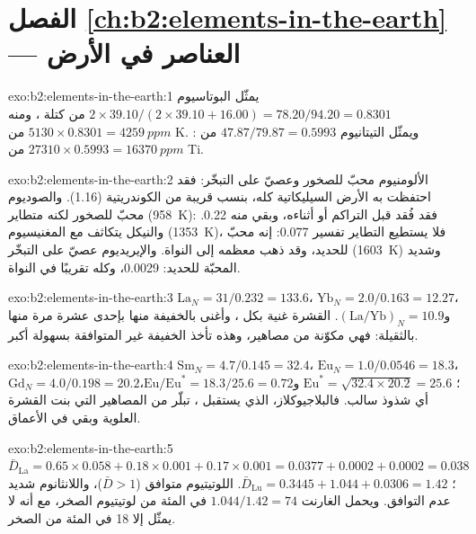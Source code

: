 \section*{الفصل \ref{ch:b2:elements-in-the-earth} --- العناصر في الأرض}

\begin{solution}{exo:b2:elements-in-the-earth:1}
يمثّل البوتاسيوم $2\times39.10/(2\times39.10+16.00) = 78.20/94.20 = 0.8301$ من كتلة
، ومنه $\num{5130}\times0.8301 = \qty{4259}{ppm}$ من K. ويمثّل التيتانيوم
$47.87/79.87 = 0.5993$ من : $\num{27310}\times0.5993 = \qty{16370}{ppm}$ من Ti.
\end{solution}

\begin{solution}{exo:b2:elements-in-the-earth:2}
الألومنيوم محبّ للصخور وعصيّ على التبخّر: فقد احتفظت به الأرض السيليكاتية كله، بنسب قريبة
من الكوندريتية (1.16). والصوديوم محبّ للصخور لكنه متطاير (\qty{958}{K}): فقد
فُقد قبل التراكم أو أثناءه، وبقي منه 0.22. والنيكل يتكاثف مع المغنيسيوم
(\qty{1353}{K})، فلا يستطيع التطاير تفسير 0.077: إنه محبّ للحديد، وقد ذهب معظمه
إلى النواة. والإيريديوم عصيّ على التبخّر (\qty{1603}{K}) وشديد المحبّة للحديد:
0.0029، وكله تقريبًا في النواة.
\end{solution}

\begin{solution}{exo:b2:elements-in-the-earth:3}
$\mathrm{La}_N = 31/0.232 = 133.6$، $\mathrm{Yb}_N = 2.0/0.163 = 12.27$،
و$(\mathrm{La}/\mathrm{Yb})_N = 10.9$. القشرة غنية بكل ،
وأغنى بالخفيفة منها بإحدى عشرة مرة منها بالثقيلة: فهي مكوّنة من مصاهير، وهذه
تأخذ  الخفيفة غير المتوافقة بسهولة أكبر.
\end{solution}

\begin{solution}{exo:b2:elements-in-the-earth:4}
$\mathrm{Sm}_N = 4.7/0.145 = 32.4$، $\mathrm{Eu}_N = 1.0/0.0546 = 18.3$،
$\mathrm{Gd}_N = 4.0/0.198 = 20.2$؛ $\mathrm{Eu}^* = \sqrt{32.4\times20.2} = 25.6$
و$\mathrm{Eu}/\mathrm{Eu}^* = 18.3/25.6 = 0.72$، أي شذوذ سالب. فالبلاجيوكلاز، الذي
يستقبل ، تبلّر من المصاهير التي بنت القشرة العلوية وبقي
في الأعماق.
\end{solution}

\begin{solution}{exo:b2:elements-in-the-earth:5}
$\bar D_{\mathrm{La}} = 0.65\times0.058+0.18\times0.001+0.17\times0.001 = 0.0377 +
0.0002 + 0.0002 = 0.038$؛ $\bar D_{\mathrm{Lu}} = 0.3445+1.044+0.0306 = 1.42$. اللوتيتيوم
متوافق ($\bar D > 1$)، واللانثانوم شديد عدم التوافق. ويحمل الغارنت
$1.044/1.42 = 74$ في المئة من لوتيتيوم الصخر، مع أنه لا يمثّل إلا 18 في المئة من
الصخر.
\end{solution}

